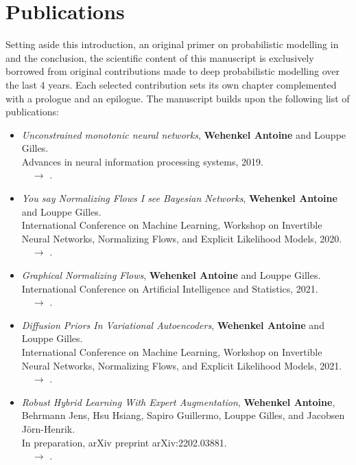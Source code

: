 \section{Publications}
Setting aside this introduction, an original primer on probabilistic modelling in  and the conclusion,
the scientific content of this manuscript is exclusively borrowed from original contributions made to deep probabilistic modelling over the last 4 years.
Each selected contribution sets its own chapter complemented with a prologue and an epilogue.
The manuscript builds upon the following list of publications:
  \begin{itemize}
  \item[] \citep{wehenkel_unconstrained_2019} \textit{Unconstrained monotonic neural networks},
  \textbf{Wehenkel Antoine} and Louppe Gilles.\\
  Advances in neural information processing systems, 2019.\\
  $\quad \rightarrow$ .

  \item[] \citep{wehenkel_you_2020} \textit{You say Normalizing Flows I see Bayesian Networks},
  \textbf{Wehenkel Antoine} and Louppe Gilles.\\
  International Conference on Machine Learning, Workshop on Invertible Neural Networks, Normalizing Flows, and Explicit Likelihood Models, 2020.\\
  $\quad \rightarrow$ .

  \item[] \citep{wehenkel2021graphical} \textit{Graphical Normalizing Flows},
  \textbf{Wehenkel Antoine} and Louppe Gilles.\\
  International Conference on Artificial Intelligence and Statistics, 2021.\\
  $\quad \rightarrow$ .

  \item[] \citep{wehenkel2021diffusion} \textit{Diffusion Priors In Variational Autoencoders},
  \textbf{Wehenkel Antoine} and Louppe Gilles.\\
  International Conference on Machine Learning, Workshop on Invertible Neural Networks, Normalizing Flows, and Explicit Likelihood Models, 2021.\\
  $\quad \rightarrow$ .

  \item[] \citep{wehenkel2022robust} \textit{Robust Hybrid Learning With Expert Augmentation},
  \textbf{Wehenkel Antoine}, Behrmann Jens, Hsu Hsiang, Sapiro Guillermo, Louppe Gilles, and Jacobsen J{\"o}rn-Henrik.\\
  In preparation, arXiv preprint arXiv:2202.03881.\\
  $\quad \rightarrow$ .

  \end{itemize}

